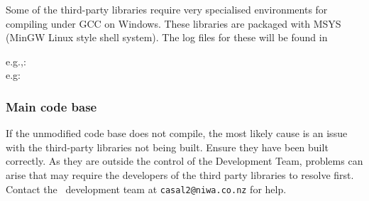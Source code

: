 Some of the third-party libraries require very specialised environments for compiling under GCC on Windows. These libraries are packaged with MSYS (MinGW Linux style shell system). The log files for these will be found in 

e.g.,: \\
e.g: 

\subsubsection{Main code base}

If the unmodified code base does not compile, the most likely cause is an issue with the third-party libraries not being built. Ensure they have been built correctly. As they are outside the control of the Development Team, problems can arise that may require the developers of the third party libraries to resolve first. Contact the \CNAME\ development team at \texttt{casal2@niwa.co.nz} for help.

